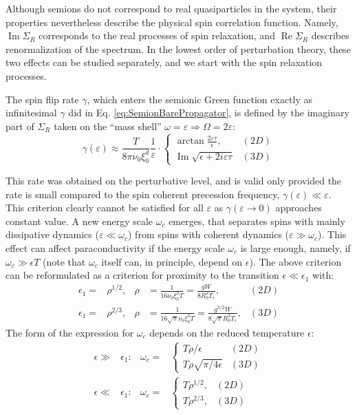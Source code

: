 \documentclass[twocolumn,english,prb]{revtex4-1}
\renewcommand{\Re}{\operatorname{Re}}
\renewcommand{\Im}{\operatorname{Im}}
\begin{document}
Although semions do not correspond to real quasiparticles in the system, their properties nevertheless describe the physical spin correlation function. Namely, $\Im \Sigma_R$ corresponds to the real processes of spin relaxation, and $\Re \Sigma_R$ describes renormalization of the spectrum. In the lowest order of perturbation theory, these two effects can be studied separately, and we start with the spin relaxation processes.

The spin flip rate $\gamma$, which enters the semionic Green function exactly as infinitesimal $\gamma$ did in Eq. \eqref{eq:SemionBarePropagator}, is defined by the imaginary part of $\Sigma_R$ taken on the ``mass shell'' $\omega = \varepsilon \Rightarrow \Omega = 2 \varepsilon$:
\begin{equation}
\label{eq:SemionicDecay}
\gamma(\varepsilon)\approx\frac{T}{8\pi\nu_{0}\xi_{0}^{d}}\frac{1}{\varepsilon}\cdot\begin{cases}
\arctan\frac{2\varepsilon\tau}{\epsilon}, & (2D)\\
\Im \sqrt{\epsilon+2i\varepsilon\tau} & (3D)
\end{cases}
\end{equation} 

This rate was obtained on the perturbative level, and is valid only provided the rate is small compared to the spin coherent precession frequency, $\gamma(\varepsilon) \ll \varepsilon$. This criterion clearly cannot be satisfied for all $\varepsilon$ as $\gamma(\varepsilon \to 0)$ approaches constant value. 
A new energy scale $\omega_c$ emerges, that separates spins with mainly dissipative dynamics ($\varepsilon \ll \omega_c$) from spins with coherent dynamics ($\varepsilon \gg \omega_c$). This effect can affect  paraconductivity if the energy scale
$\omega_c$  is large enough, namely, if $\omega_c \gg \epsilon T$ (note that $\omega_c$ itself can, in principle, depend on $\epsilon$). The above  criterion can be reformulated as a criterion for proximity to the transition $\epsilon \ll \epsilon_1$ with:
\begin{align}
\label{eq:rho2D}
\epsilon_{1}=&\rho^{1/2}, 
&\rho &=\frac{1}{16 \nu_0 \xi_{0}^{2}T} = \frac{g W}{8 R_0^2 T_c}, &(2D)\\
\label{eq:rho3D}
\epsilon_{1}=&\rho^{2/3}, 
&\rho &=\frac{1}{16 \sqrt{\pi} \nu_0 \xi_{0}^{3}T} = \frac{g^{3/2} W}{8 \sqrt{\pi} R_0^3 T_c}, &(3D)
\end{align}
The form of  the expression for $\omega_c$  depends on the reduced temperature $\epsilon$:
\begin{align}
\label{eq:omegac2D}
\epsilon\gg&\epsilon_{1}:& \omega_{c} = &\begin{cases}
T \rho / \epsilon & (2D)\\
T \rho \sqrt{\pi / 4\epsilon} & (3D)
\end{cases}\\
\label{eq:omegac3D}
\epsilon\ll&\epsilon_{1}:& \omega_{c} = &\begin{cases}
T\rho^{1/2}, & (2D)\\
T\rho^{2/3}, & (3D)
\end{cases}
\end{align}
\end{document}
